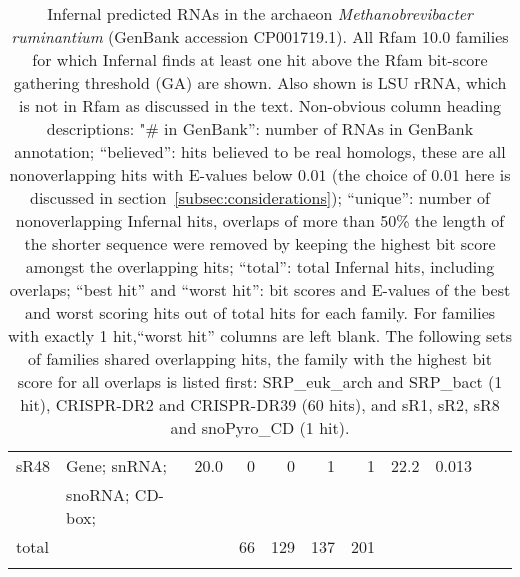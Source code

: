 \begin{footnotesize}
\begin{table}
\begin{center}
\begin{tabular}{|l|l|r|r||r|r|r||r|r||r|r||}
sR48                            &  Gene; snRNA;          &  20.0  &     0  &       0  &       1  &      1 &   22.2  &    0.013 \\
                                &  snoRNA; CD-box;       &        &        &          &          &        &         &          \\
total                           &                        &        &     66 &     129  &      137 &     201&         &          \\ \hline
\noalign{\smallskip}\hline\noalign{\smallskip}
\end{tabular}
\caption{Infernal predicted RNAs in the archaeon
  \emph{Methanobrevibacter ruminantium} (GenBank accession
  CP001719.1). All Rfam 10.0 families \cite{Gardner11} for which
  Infernal finds at least one hit above the Rfam bit-score gathering
  threshold (GA) are shown. Also shown is LSU rRNA, which is not in
  Rfam as discussed in the text. Non-obvious column heading
  descriptions: "\# in GenBank'': number of RNAs in GenBank
  annotation; ``believed'': hits believed to be real homologs, these
  are all nonoverlapping hits with E-values below $0.01$ (the choice
  of $0.01$ here is discussed in section~\ref{subsec:considerations});
  ``unique'': number of nonoverlapping Infernal hits, overlaps of more
  than 50\% the length of the shorter sequence were removed by keeping
  the highest bit score amongst the overlapping hits; ``total'': total
  Infernal hits, including overlaps; ``best hit'' and ``worst hit'':
  bit scores and E-values of the best and worst scoring hits out of
  total hits for each family. For families with exactly 1 hit,``worst
  hit'' columns are left blank. The following sets of families shared
  overlapping hits, the family with the highest bit score for all
  overlaps is listed first: SRP\_euk\_arch and SRP\_bact (1 hit),
  CRISPR-DR2 and CRISPR-DR39 (60 hits), and sR1, sR2, sR8 and
  snoPyro\_CD (1 hit).}
\end{center}
\end{table}
\end{footnotesize}
